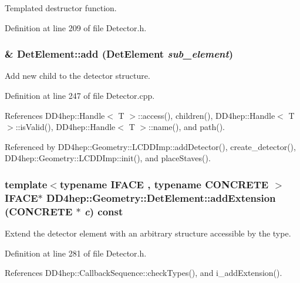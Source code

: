 Templated destructor function. 

Definition at line 209 of file Detector.h.\hypertarget{class_d_d4hep_1_1_geometry_1_1_det_element_a336e54ac88a2f3493f82138699899517}{
\subsubsection[{add}]{ \& DetElement::add ({\bf DetElement} {\em sub\_\-element})}}
\label{class_d_d4hep_1_1_geometry_1_1_det_element_a336e54ac88a2f3493f82138699899517}


Add new child to the detector structure. 

Definition at line 247 of file Detector.cpp.

References DD4hep::Handle$<$ T $>$::access(), children(), DD4hep::Handle$<$ T $>$::isValid(), DD4hep::Handle$<$ T $>$::name(), and path().

Referenced by DD4hep::Geometry::LCDDImp::addDetector(), create\_\-detector(), DD4hep::Geometry::LCDDImp::init(), and placeStaves().\hypertarget{class_d_d4hep_1_1_geometry_1_1_det_element_a0ef6d28c7c6778cf0f42b77a71212699}{
\subsubsection[{addExtension}]{\setlength{\rightskip}{0pt plus 5cm}template$<$typename IFACE , typename CONCRETE $>$ IFACE$\ast$ DD4hep::Geometry::DetElement::addExtension (CONCRETE $\ast$ {\em c}) const}}
\label{class_d_d4hep_1_1_geometry_1_1_det_element_a0ef6d28c7c6778cf0f42b77a71212699}


Extend the detector element with an arbitrary structure accessible by the type. 

Definition at line 281 of file Detector.h.

References DD4hep::CallbackSequence::checkTypes(), and i\_\-addExtension().


